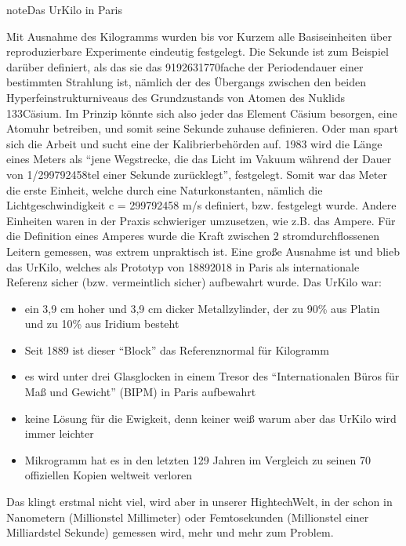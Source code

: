 \documentclass[letterpaper,10pt,english]{jupyterBook}
\begin{document}
\begin{sphinxadmonition}{note}{Das Ur\sphinxhyphen{}Kilo in Paris}

\sphinxAtStartPar
Mit Ausnahme des Kilogramms wurden bis vor Kurzem alle Basiseinheiten über reproduzierbare Experimente eindeutig festgelegt. Die Sekunde ist zum Beispiel darüber definiert, als das sie das 9192631770\sphinxhyphen{}fache der Periodendauer einer bestimmten Strahlung ist, nämlich der des Übergangs zwischen den beiden Hyperfeinstrukturniveaus des Grundzustands von Atomen des Nuklids 133\sphinxhyphen{}Cäsium. Im Prinzip könnte sich also jeder das Element Cäsium besorgen, eine Atomuhr betreiben, und somit seine Sekunde zuhause definieren. Oder man spart sich die Arbeit und sucht eine der Kalibrierbehörden auf.
1983 wird die Länge eines Meters als “jene Wegstrecke, die das Licht im Vakuum während der Dauer von 1/299792458\sphinxhyphen{}tel einer Sekunde zurücklegt”, festgelegt. Somit war das Meter die erste Einheit, welche durch eine Naturkonstanten, nämlich die Lichtgeschwindigkeit c = 299792458 m/s definiert, bzw. festgelegt wurde. Andere Einheiten waren in der Praxis schwieriger umzusetzen, wie z.B. das Ampere. Für die Definition eines Amperes wurde die Kraft zwischen 2 stromdurchflossenen Leitern gemessen, was extrem unpraktisch ist.
Eine große Ausnahme ist und blieb das Ur\sphinxhyphen{}Kilo, welches als Prototyp von 1889\sphinxhyphen{}2018 in Paris als internationale Referenz sicher (bzw. vermeintlich sicher) aufbewahrt wurde. Das Ur\sphinxhyphen{}Kilo war:
\begin{itemize}
\item {} 
\sphinxAtStartPar
ein 3,9 cm hoher und 3,9 cm dicker Metallzylinder, der zu 90\% aus Platin und zu 10\% aus Iridium besteht

\item {} 
\sphinxAtStartPar
Seit 1889 ist dieser “Block” das Referenznormal für Kilogramm

\item {} 
\sphinxAtStartPar
es wird unter drei Glasglocken in einem Tresor des “Internationalen Büros für Maß und Gewicht” (BIPM) in Paris aufbewahrt

\item {} 
\sphinxAtStartPar
keine Lösung für die Ewigkeit, denn \sphinxhyphen{} keiner weiß warum \sphinxhyphen{} aber das Ur\sphinxhyphen{}Kilo wird immer leichter

\item {} 
 Mikrogramm hat es in den letzten 129 Jahren im Vergleich zu seinen 70 offiziellen Kopien weltweit verloren

\end{itemize}

\sphinxAtStartPar
{}

\sphinxAtStartPar
Das klingt erstmal nicht viel, wird aber in unserer Hightech\sphinxhyphen{}Welt, in der schon in Nanometern (Millionstel Millimeter) oder Femtosekunden (Millionstel einer Milliardstel Sekunde) gemessen wird, mehr und mehr zum Problem.
\end{sphinxadmonition}
\end{document}
